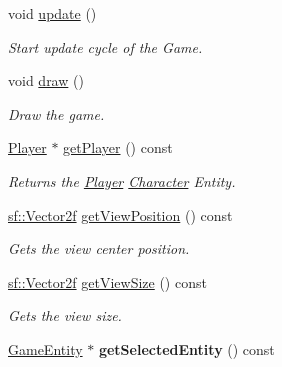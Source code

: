 \begin{DoxyCompactItemize}
\mbox{\label{class_game_manager_a7ecc3a14cd9e92f50729b37d1364953f}} 
void \mbox{\hyperlink{class_game_manager_a7ecc3a14cd9e92f50729b37d1364953f}{update}} ()
\begin{DoxyCompactList}\small\item\em Start update cycle of the Game. \end{DoxyCompactList}\item 
\mbox{\label{class_game_manager_a4fa99153e63dc3419ba126af71188cfa}} 
void \mbox{\hyperlink{class_game_manager_a4fa99153e63dc3419ba126af71188cfa}{draw}} ()
\begin{DoxyCompactList}\small\item\em Draw the game. \end{DoxyCompactList}\item 
\mbox{\label{class_game_manager_aecbc75c7bd6a801763b9b81bea88a0b0}} 
\mbox{\hyperlink{class_player}{Player}} $\ast$ \mbox{\hyperlink{class_game_manager_aecbc75c7bd6a801763b9b81bea88a0b0}{get\+Player}} () const
\begin{DoxyCompactList}\small\item\em Returns the \mbox{\hyperlink{class_player}{Player}} \mbox{\hyperlink{class_character}{Character}} Entity. \end{DoxyCompactList}\item 
\mbox{\label{class_game_manager_a8dcfd7cfa1fb828ae40f9983a32ce35c}} 
\mbox{\hyperlink{classsf_1_1_vector2}{sf\+::\+Vector2f}} \mbox{\hyperlink{class_game_manager_a8dcfd7cfa1fb828ae40f9983a32ce35c}{get\+View\+Position}} () const
\begin{DoxyCompactList}\small\item\em Gets the view center position. \end{DoxyCompactList}\item 
\mbox{\label{class_game_manager_aca90210fd830cf3a5729ff9926518545}} 
\mbox{\hyperlink{classsf_1_1_vector2}{sf\+::\+Vector2f}} \mbox{\hyperlink{class_game_manager_aca90210fd830cf3a5729ff9926518545}{get\+View\+Size}} () const
\begin{DoxyCompactList}\small\item\em Gets the view size. \end{DoxyCompactList}\item 
\mbox{\label{class_game_manager_ad1606e8a64b5ef48ec87371e01ec7d8a}} 
\mbox{\hyperlink{class_game_entity}{Game\+Entity}} $\ast$ {\bfseries get\+Selected\+Entity} () const
\end{DoxyCompactItemize}
